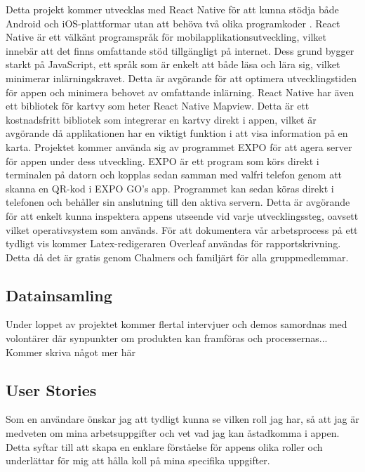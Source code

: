 Detta projekt kommer utvecklas med React Native för att kunna stödja både Android och iOS-plattformar utan att behöva två olika programkoder \cite{react}. React Native är ett välkänt programspråk för mobilapplikationsutveckling, vilket innebär att det finns omfattande stöd tillgängligt på internet. Dess grund bygger starkt på JavaScript, ett språk som är enkelt att både läsa och lära sig, vilket minimerar inlärningskravet. Detta är avgörande för att optimera utvecklingstiden för appen och minimera behovet av omfattande inlärning. React Native har även ett bibliotek för kartvy som heter React Native Mapview. Detta är ett kostnadsfritt bibliotek som integrerar en kartvy direkt i appen, vilket är avgörande då applikationen har en viktigt funktion i att visa information på en karta. Projektet kommer använda sig av programmet EXPO för att agera server för appen under dess utveckling. EXPO är ett program som körs direkt i terminalen på datorn och kopplas sedan samman med valfri telefon genom att skanna en QR-kod i EXPO GO's app. Programmet kan sedan köras direkt i telefonen och behåller sin anslutning till den aktiva servern. Detta är avgörande för att enkelt kunna inspektera appens utseende vid varje utvecklingssteg, oavsett vilket operativsystem som används. För att dokumentera vår arbetsprocess på ett tydligt vis kommer Latex-redigeraren Overleaf användas för rapportskrivning. Detta då det är gratis genom Chalmers och familjärt för alla gruppmedlemmar.

\subsection{Datainsamling}

Under loppet av projektet kommer flertal intervjuer och demos samordnas med volontärer där synpunkter om produkten kan framföras och processernas... Kommer skriva något mer här

\subsection{User Stories}


Som en användare önskar jag att tydligt kunna se vilken roll jag har, så att jag är medveten om mina arbetsuppgifter och vet vad jag kan åstadkomma i appen. Detta syftar till att skapa en enklare förståelse för appens olika roller och underlättar för mig att hålla koll på mina specifika uppgifter.


